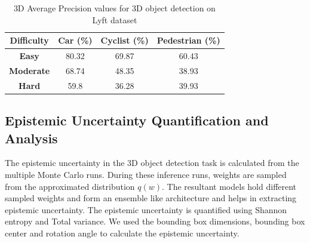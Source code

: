\documentclass[10pt,twocolumn,letterpaper]{article}
\begin{document}
\begin{table}[!htbp]
    \centering
    \begin{tabular}{|c|c|c|c|}
        \hline \textbf{Difficulty} & \textbf{Car (\%)} & \textbf{Cyclist (\%)} & \textbf{Pedestrian (\%)}  \\
        \hline \textbf{Easy} & 80.32  & 69.87  & 60.43 \\
        \hline \textbf{Moderate} & 68.74  & 48.35 & 38.93 \\
        \hline \textbf{Hard} & 59.8  & 36.28  & 39.93  \\
        \hline
    \end{tabular}
	\caption[3D AP calculated for 2D proposals generated from 3D Annotations]{3D Average Precision values for 3D object detection on Lyft dataset  \cite{Lyft2019}}
	\label{3DAP Values-2}
    \end{table}
\subsection{Epistemic Uncertainty Quantification and Analysis}
The epistemic uncertainty in the 3D object detection task is calculated from the multiple Monte Carlo runs. During these inference runs, weights are sampled from the approximated distribution $q(w)$. The resultant models hold different sampled weights and form an ensemble like architecture and helps in extracting epistemic uncertainty. The epistemic uncertainty is quantified using Shannon entropy and Total variance. We used the bounding box dimensions, bounding box center and rotation angle to calculate the epistemic uncertainty.
\end{document}
